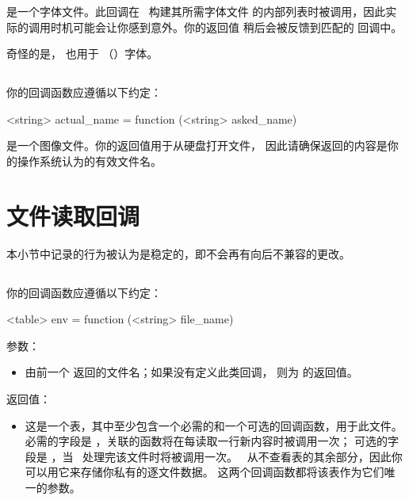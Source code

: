  是一个字体文件。此回调在 \LUATEX\ 构建其所需字体文件
的内部列表时被调用，因此实际的调用时机可能会让你感到意外。你的返回值
稍后会被反馈到匹配的  回调中。

奇怪的是， 也用于 \OPENTYPE{}（）字体。

\subsection{}


你的回调函数应遵循以下约定：

\begin{typing}
<string> actual_name =
    function (<string> asked_name)
\end{typing}

 是一个图像文件。你的返回值用于从硬盘打开文件，
因此请确保返回的内容是你的操作系统认为的有效文件名。

\section{文件读取回调}\label{iocallback}

本小节中记录的行为被认为是稳定的，即不会再有向后不兼容的更改。

\subsection{}


你的回调函数应遵循以下约定：

\begin{typing}
<table> env =
    function (<string> file_name)
\end{typing}

参数：

\begin{itemize}
\item[\\texttt{file\_name}]

由前一个  返回的文件名；如果没有定义此类回调，
则为  的返回值。

\end{itemize}

返回值：

\begin{itemize}
\item[\texttt{env}]

这是一个表，其中至少包含一个必需的和一个可选的回调函数，用于此文件。
必需的字段是 ，关联的函数将在每读取一行新内容时被调用一次；
可选的字段是 ，当 \LUATEX\ 处理完该文件时将被调用一次。
\LUATEX\ 从不查看表的其余部分，因此你可以用它来存储你私有的逐文件数据。
这两个回调函数都将该表作为它们唯一的参数。

\end{itemize}

